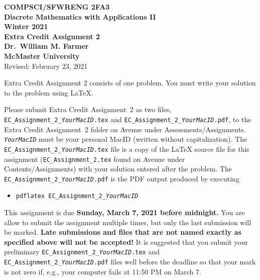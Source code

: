 \documentclass[11pt,fleqn]{article}
\newcommand{\bsp}{\begin{sloppypar}}
\newcommand{\esp}{\end{sloppypar}}
\begin{document}
\begin{center}

  {\large \textbf{COMPSCI/SFWRENG 2FA3}}\\[2mm]
  {\large \textbf{Discrete Mathematics with Applications II}}\\[2mm]
  {\large \textbf{Winter 2021}}\\[8mm]
  {\huge \textbf{Extra Credit Assignment 2}}\\[6mm]
  {\large \textbf{Dr.~William M. Farmer}}\\[2mm]
  {\large \textbf{McMaster University}}\\[6mm]
  {\large Revised: February 23, 2021}

\end{center}

\medskip

Extra Credit Assignment 2 consists of one problem.  You must write
your solution to the problem using LaTeX.

\bsp
Please submit Extra Credit Assignment~2 as two files,
\texttt{EC\_Assignment\_2\_\emph{YourMacID}.tex} and
\texttt{EC\_Assignment\_2\_\emph{YourMacID}.pdf}, to the Extra Credit
Assignment~2 folder on Avenue under Assessments/Assignments.
\texttt{\emph{YourMacID}} must be your personal MacID (written without
capitalization).  The \texttt{EC\_Assignment\_2\_\emph{YourMacID}.tex}
file is a copy of the LaTeX source file for this assignment
(\texttt{EC\_Assignment\_2.tex} found on Avenue under
Contents/Assignments) with your solution entered after the problem.
The \texttt{EC\_Assignment\_2\_\emph{YourMacID}.pdf} is the PDF output
produced by executing
\esp

\begin{itemize}

  \item[] \texttt{pdflatex EC\_Assignment\_2\_\emph{YourMacID}}

\end{itemize}

This assignment is due \textbf{Sunday, March 7, 2021 before midnight.}
You are allow to submit the assignment multiple times, but only the
last submission will be marked.  \textbf{Late submissions and files
  that are not named exactly as specified above will not be accepted!}
It is suggested that you submit your preliminary
\texttt{EC\_Assignment\_2\_\emph{YourMacID}.tex} and
\texttt{EC\_Assignment\_2\_\emph{YourMacID}.pdf} files well before the
deadline so that your mark is not zero if, e.g., your computer fails
at 11:50 PM on March 7.
\end{document}
